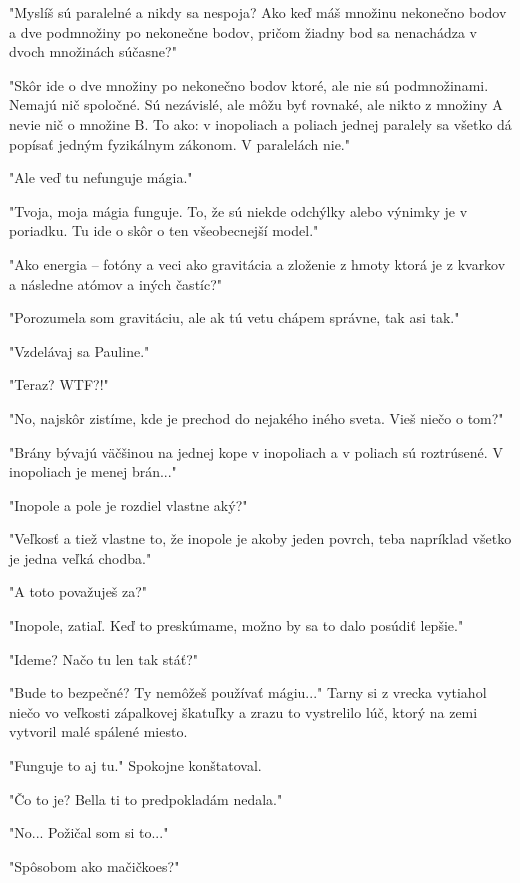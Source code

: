 \documentclass{book}
\begin{document}
"$ $Myslíš sú paralelné a nikdy sa nespoja? Ako keď máš množinu nekonečno bodov a dve podmnožiny po nekonečne bodov, pričom žiadny bod sa nenachádza v dvoch množinách súčasne?"$ $ 

"$ $Skôr ide o dve množiny po nekonečno bodov ktoré, ale nie sú podmnožinami. Nemajú nič spoločné. Sú nezávislé, ale môžu byť rovnaké, ale nikto z množiny A nevie nič o množine B. To ako: v inopoliach a poliach jednej paralely sa všetko dá popísať jedným fyzikálnym zákonom. V paralelách nie."$ $ 

"$ $Ale veď tu nefunguje mágia."$ $ 

"$ $Tvoja, moja mágia funguje. To, že sú niekde odchýlky alebo výnimky je v poriadku. Tu ide o skôr o ten všeobecnejší model."$ $ 

"$ $Ako energia – fotóny a veci ako gravitácia a zloženie z hmoty ktorá je z kvarkov a následne atómov a iných častíc?"$ $ 

"$ $Porozumela som gravitáciu, ale ak tú vetu chápem správne, tak asi tak."$ $ 

"$ $Vzdelávaj sa Pauline."$ $ 

"$ $Teraz? WTF?!"$ $ 

"$ $No, najskôr zistíme, kde je prechod do nejakého iného sveta. Vieš niečo o tom?"$ $ 

"$ $Brány bývajú väčšinou na jednej kope v inopoliach a v poliach sú roztrúsené. V inopoliach je menej brán..."$ $ 

"$ $Inopole a pole je rozdiel vlastne aký?"$ $ 

"$ $Veľkosť a tiež vlastne to, že inopole je akoby jeden povrch, teba napríklad všetko je jedna veľká chodba."$ $ 

"$ $A toto považuješ za?"$ $ 

"$ $Inopole, zatiaľ. Keď to preskúmame, možno by sa to dalo posúdiť lepšie."$ $ 

"$ $Ideme? Načo tu len tak stáť?"$ $ 

"$ $Bude to bezpečné? Ty nemôžeš používať mágiu..."$ $  Tarny si z vrecka vytiahol niečo vo veľkosti zápalkovej škatuľky a zrazu to vystrelilo lúč, ktorý na zemi vytvoril malé spálené miesto.

"$ $Funguje to aj tu."$ $  Spokojne konštatoval.

"$ $Čo to je? Bella ti to predpokladám nedala."$ $ 

"$ $No... Požičal som si to..."$ $ 

"$ $Spôsobom ako mačičkoes?"$ $ 
\end{document}
